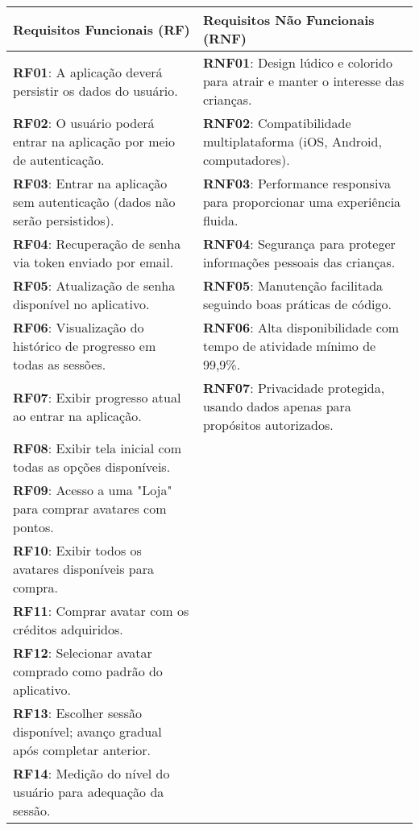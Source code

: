 \begin{itemize}
\begin{longtable}{|p{6cm}|p{6cm}|}
    \hline
    \textbf{Requisitos Funcionais (RF)} & \textbf{Requisitos Não Funcionais (RNF)} \\
    \hline
    \endhead

    \hline
    \endfoot

    \hline
    \endlastfoot

    \small
    \textbf{RF01}: A aplicação deverá persistir os dados do usuário. & \textbf{RNF01}: Design lúdico e colorido para atrair e manter o interesse das crianças. \\
    \hline
    \textbf{RF02}: O usuário poderá entrar na aplicação por meio de autenticação. & \textbf{RNF02}: Compatibilidade multiplataforma (iOS, Android, computadores). \\
    \hline
    \textbf{RF03}: Entrar na aplicação sem autenticação (dados não serão persistidos). & \textbf{RNF03}: Performance responsiva para proporcionar uma experiência fluida. \\
    \hline
    \textbf{RF04}: Recuperação de senha via token enviado por email. & \textbf{RNF04}: Segurança para proteger informações pessoais das crianças. \\
    \hline
    \textbf{RF05}: Atualização de senha disponível no aplicativo. & \textbf{RNF05}: Manutenção facilitada seguindo boas práticas de código. \\
    \hline
    \textbf{RF06}: Visualização do histórico de progresso em todas as sessões. & \textbf{RNF06}: Alta disponibilidade com tempo de atividade mínimo de 99,9\%. \\
    \hline
    \textbf{RF07}: Exibir progresso atual ao entrar na aplicação. & \textbf{RNF07}: Privacidade protegida, usando dados apenas para propósitos autorizados. \\
    \hline
    \textbf{RF08}: Exibir tela inicial com todas as opções disponíveis. & \\
    \hline
    \textbf{RF09}: Acesso a uma "Loja" para comprar avatares com pontos. & \\
    \hline
    \textbf{RF10}: Exibir todos os avatares disponíveis para compra. & \\
    \hline
    \textbf{RF11}: Comprar avatar com os créditos adquiridos. & \\
    \hline
    \textbf{RF12}: Selecionar avatar comprado como padrão do aplicativo. & \\
    \hline
    \textbf{RF13}: Escolher sessão disponível; avanço gradual após completar anterior. & \\
    \hline
    \textbf{RF14}: Medição do nível do usuário para adequação da sessão. & \\

\end{longtable}
\end{itemize}
